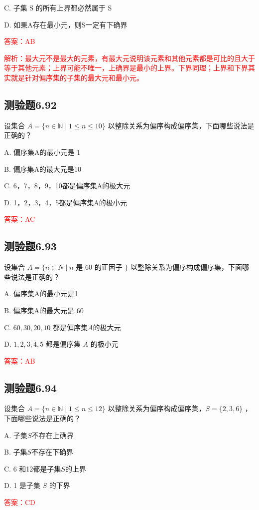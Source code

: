 \documentclass[UTF8, heading=true]{ctexart}
\begin{document}
C. 子集 S 的所有上界都必然属于 S

D. 如果A存在最小元，则S一定有下确界

\textcolor{red}{答案：AB}

\textcolor{red}{解析：最大元不是最大的元素，有最大元说明该元素和其他元素都是可比的且大于等于其他元素；上界可能不唯一，上确界是最小的上界。下界同理；上界和下界其实就是针对偏序集的子集的最大元和最小元。}

\subsection{测验题6.92}

设集合 $A=\{n \in \mathbb{N} \mid 1 \leq n \leq 10\}$ 以整除关系为偏序构成偏序集，下面哪些说法是正确的？

A. 偏序集A的最小元是 1

B. 偏序集A的最大元是10

C. 6，7，8，9，10都是偏序集A的极大元

D. 1，2，3，4，5都是偏序集A的极小元

\textcolor{red}{答案：AC}

\subsection{测验题6.93}

设集合 $A=\{n \in N \mid n$ 是 60 的正因子 $\}$ 以整除关系为偏序构成偏序集，下面哪些说法是正确的？

A. 偏序集A的最小元是1

B. 偏序集A的最大元是 60

C. $60,30,20,10$ 都是偏序集$A$的极大元

D. $1,2,3,4,5$ 都是偏序集 $A$ 的极小元

\textcolor{red}{答案：AB}

\subsection{测验题6.94}

设集合 $A=\{n \in \mathbb{N} \mid 1 \leq n \leq 12\}$ 以整除关系为偏序构成偏序集，$S=\{2,3,6\}$ ，下面哪些说法是正确的？

A. 子集$S$不存在上确界

B. 子集$S$不存在下确界

C. 6 和12都是子集$S$的上界

D. 1 是子集 $S$ 的下界

\textcolor{red}{答案：CD}
\end{document}
